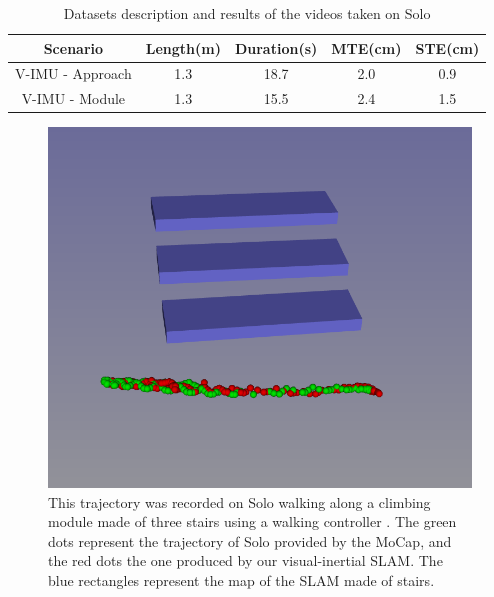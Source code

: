 \begin{table}[h]
   \begin{center}
   \caption{Datasets description and results of the videos taken on Solo}
   \label{tab:solo}
    \begin{tabular}{|c|c|c|c|c|}
        \hline 
        Scenario  & Length(m) & Duration(s) & MTE(cm) & STE(cm) \\
        \hline 
         V-IMU - Approach & 1.3 & 18.7 & 2.0 & 0.9\\
        \hline 
         V-IMU - Module & 1.3 & 15.5 & 2.4 & 1.5 \\
        \hline
    \end{tabular}
    \end{center}
\end{table}

\begin{figure}[!ht]
  \centering
  \includegraphics[width=\linewidth]{figures/cosyslam/mapped_stairs.png}
  \caption{This trajectory was recorded on Solo walking along a climbing module made of three stairs using a walking controller \cite{leziart2021implementation}. 
  The green dots represent the trajectory of Solo provided by the MoCap, and the red dots the one produced by our visual-inertial SLAM. 
  The blue rectangles represent the map of the SLAM made of stairs.}
  \label{fig:map_stairs}
\end{figure}
